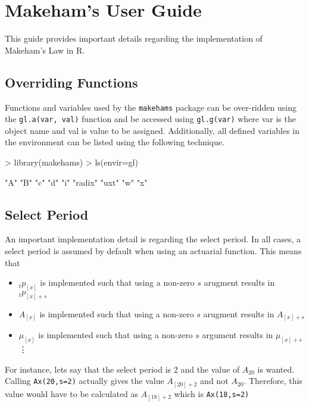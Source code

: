 \documentclass{article}
\begin{document}
\large{}


\section{Makeham's User Guide} 

This guide provides important details regarding the implementation of Makeham's Law in R.

\subsection{Overriding Functions}
Functions and variables used by the \texttt{makehams} package can be over-ridden using the \texttt{gl.a(var, val)} function and be accessed using \texttt{gl.g(var)} where var is the object name and val is value to be assigned. Additionally, all defined variables in the environment can be listed using the following technique.

\begin{Schunk}
\begin{Sinput}
> library(makehams)
> ls(envir=gl)
\end{Sinput}
\begin{Soutput}
[1] "A"     "B"     "c"     "d"     "i"     "radix" "uxt"   "w"     "x"    
\end{Soutput}
\end{Schunk}

\subsection{Select Period}

An important implementation detail is regarding the select period. In all cases, a select period is assumed by default when using an actuarial function. This means that

\begin{itemize}
\item ${}_tp_{[x]}$ is implemented such that using a non-zero $s$ arugment results in ${}_tp_{[x]+s}$
\item $A_{[x]}$ is implemented such that using a non-zero $s$ arugment results in $A_{[x]+s}$
\item $\mu_{[x]}$ is implemented such that using a non-zero $s$ argument results in $\mu_{[x]+s}$ \\
\vdots
\end{itemize}

For instance, lets say that the select period is 2 and the value of $A_{20}$ is wanted. Calling \texttt{Ax(20,s=2)} actually gives the value $A_{[20]+2}$ and not $A_{20}$. Therefore, this value would have to be calculated as $A_{[18]+2}$ which is \texttt{Ax(18,s=2)}
\end{document}

